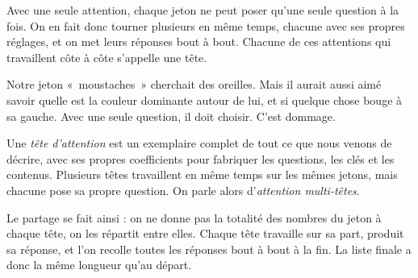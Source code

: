 \begin{enclair}
Avec une seule attention, chaque jeton ne peut poser qu'une seule question à
la fois. On en fait donc tourner plusieurs en même temps, chacune avec
ses propres réglages, et on met leurs réponses bout à bout. Chacune de ces
attentions qui travaillent côte à côte s'appelle une tête.
\end{enclair}

Notre jeton «~moustaches~» cherchait des oreilles. Mais il aurait aussi aimé
savoir quelle est la couleur dominante autour de lui, et si quelque chose
bouge à sa gauche. Avec une seule question, il doit choisir. C'est dommage.

\begin{definition}
Une \emph{tête d'attention} est un exemplaire complet de tout ce que nous
venons de décrire, avec ses propres coefficients pour fabriquer les
questions, les clés et les contenus. Plusieurs têtes travaillent en même
temps sur les mêmes jetons, mais chacune pose sa propre question. On parle
alors d'\emph{attention multi-têtes}.
\end{definition}

Le partage se fait ainsi : on ne donne pas la totalité des nombres du jeton
à chaque tête, on les répartit entre elles. Chaque tête travaille sur sa
part, produit sa réponse, et l'on recolle toutes les réponses bout à bout à
la fin. La liste finale a donc la même longueur qu'au départ.

